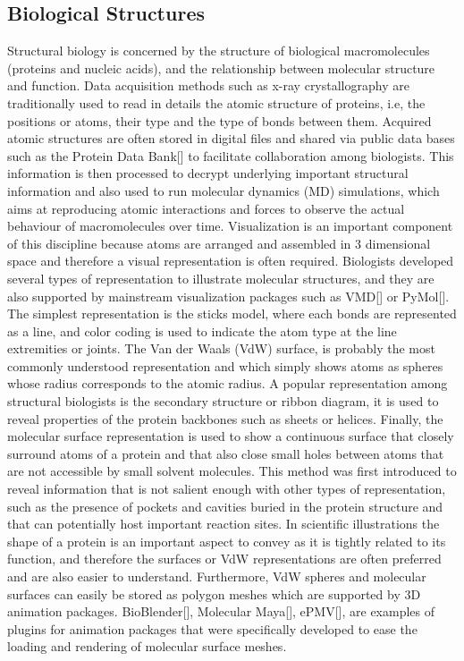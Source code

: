 \subsection{Biological Structures}

Structural biology is concerned by the structure of biological macromolecules (proteins and nucleic acids), and the relationship between molecular structure and function.
Data acquisition methods such as x-ray crystallography are traditionally used to read in details the atomic structure of proteins, i.e, the positions or atoms, their type and the type of bonds between them.
Acquired atomic structures are often stored in digital files and shared via public data bases such as the Protein Data Bank[] to facilitate collaboration among biologists.
This information is then processed to decrypt underlying important structural information and also used to run molecular dynamics (MD) simulations, which aims at reproducing atomic interactions and forces to observe the actual behaviour of macromolecules over time.
Visualization is an important component of this discipline because atoms are arranged and assembled in 3 dimensional space and therefore a visual representation is often required.
Biologists developed several types of representation to illustrate molecular structures, and they are also supported by mainstream visualization packages such as VMD[] or PyMol[].
The simplest representation is the sticks model, where each bonds are represented as a line, and color coding is used to indicate the atom type at the line extremities or joints.
The Van der Waals (VdW) surface, is probably the most commonly understood representation and which simply shows atoms as spheres whose radius corresponds to the atomic radius.
A popular representation among structural biologists is the secondary structure or ribbon diagram, it is used to reveal properties of the protein backbones such as sheets or helices.
Finally, the molecular surface representation is used to show a continuous surface that closely surround atoms of a protein and that also close small holes between atoms that are not accessible by small solvent molecules.
This method was first introduced to reveal information that is not salient enough with other types of representation, such as the presence of pockets and cavities buried in the protein structure and that can potentially host important reaction sites.
In scientific illustrations the shape of a protein is an important aspect to convey as it is tightly related to its function, and therefore the surfaces or VdW representations are often preferred and are also easier to understand.
Furthermore, VdW spheres and molecular surfaces can easily be stored as polygon meshes which are supported by 3D animation packages.
BioBlender[], Molecular Maya[], ePMV[], are examples of plugins for animation packages that were specifically developed to ease the loading and rendering of molecular surface meshes.

